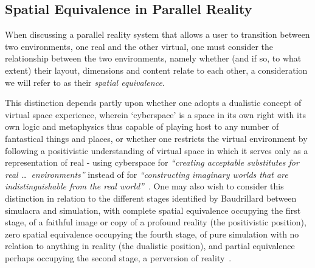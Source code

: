 
\subsection{Spatial Equivalence in Parallel Reality}

\label{spatial-equivalence}

\newcommand{\turklevrfootnote}{\footnote{\textit{``For virtual reality to be interesting it has to emulate the real. But you have to be able to do something in the virtual that you couldn't in the real.''}~\cite{Turkle1997}}}

When discussing a parallel reality system that allows a user to transition between two environments, one real and the other virtual, one must consider the relationship between the two environments, namely whether (and if so, to what extent) their layout, dimensions and content relate to each other, a consideration we will refer to as their \textit{spatial equivalence}.

This distinction depends partly upon whether one adopts a dualistic concept of virtual space experience, wherein `cyberspace' is a space in its own right with its own logic and metaphysics thus capable of playing host to any number of fantastical things and places, or whether one restricts the virtual environment by following a positivistic understanding of virtual space in which it serves only as a representation of real - using cyberspace for \textit{``creating acceptable substitutes for real \ldots\ environments''} instead of for \textit{``constructing imaginary worlds that are indistinguishable from the real world''}~\cite{Qvortrup2002}. One may also wish to consider this distinction in relation to the different stages identified by Baudrillard between simulacra and simulation, with complete spatial equivalence occupying the first stage, of a faithful image or copy of a profound reality (the positivistic position), zero spatial equivalence occupying the fourth stage, of pure simulation with no relation to anything in reality (the dualistic position), and partial equivalence perhaps occupying the second stage, a perversion of reality~\cite{Baudrillard1994}.



